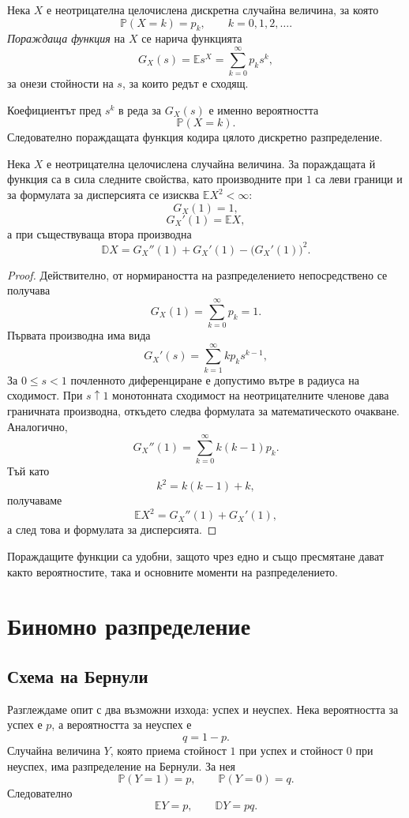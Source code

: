 \begin{defn}
Нека $X$ е неотрицателна целочислена дискретна случайна величина, за която
\[
\mathbb{P}(X=k)=p_k,\qquad k=0,1,2,\ldots .
\]
\emph{Пораждаща функция} на $X$ се нарича функцията
\[
G_X(s)=\mathbb{E}s^X=\sum_{k=0}^{\infty}p_ks^k,
\]
за онези стойности на $s$, за които редът е сходящ.
\end{defn}

Коефициентът пред $s^k$ в реда за $G_X(s)$ е именно вероятността
\[
\mathbb{P}(X=k).
\]
Следователно пораждащата функция кодира цялото дискретно разпределение.

\begin{prop}
Нека $X$ е неотрицателна целочислена случайна величина. За пораждащата й функция са в сила следните свойства, като производните при $1$ са леви граници и за формулата за дисперсията се изисква $\mathbb E X^2<\infty$:
\[
G_X(1)=1,
\]
\[
G_X'(1)=\mathbb{E}X,
\]
а при съществуваща втора производна
\[
\mathbb{D}X=G_X''(1)+G_X'(1)-\bigl(G_X'(1)\bigr)^2.
\]
\end{prop}

\begin{proof}
Действително, от нормираността на разпределението непосредствено се получава
\[
G_X(1)=\sum_{k=0}^{\infty}p_k=1.
\]
Първата производна има вида
\[
G_X'(s)=\sum_{k=1}^{\infty}kp_ks^{k-1},
\]
За $0\le s<1$ почленното диференциране е допустимо вътре в радиуса на сходимост. При $s\uparrow1$ монотонната сходимост на неотрицателните членове дава граничната производна, откъдето следва формулата за математическото очакване. Аналогично,
\[
G_X''(1)=\sum_{k=0}^{\infty}k(k-1)p_k.
\]
Тъй като
\[
k^2=k(k-1)+k,
\]
получаваме
\[
\mathbb{E}X^2=G_X''(1)+G_X'(1),
\]
а след това и формулата за дисперсията.
\end{proof}

Пораждащите функции са удобни, защото чрез едно и също пресмятане дават както вероятностите, така и основните моменти на разпределението.

\section{Биномно разпределение}\label{s:35.3}

\subsection{Схема на Бернули}\label{s:35.3.1}

Разглеждаме опит с два възможни изхода: успех и неуспех. Нека вероятността за успех е $p$, а вероятността за неуспех е
\[
q=1-p.
\]
Случайна величина $Y$, която приема стойност $1$ при успех и стойност $0$ при неуспех, има разпределение на Бернули. За нея
\[
\mathbb{P}(Y=1)=p,
\qquad
\mathbb{P}(Y=0)=q.
\]
Следователно
\[
\mathbb{E}Y=p,
\qquad
\mathbb{D}Y=pq.
\]

